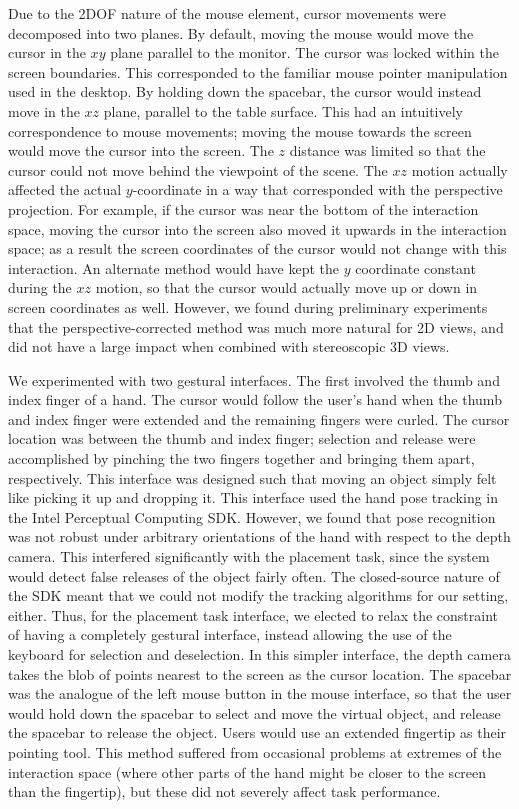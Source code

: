 \documentclass[pageno]{jpaper}
\begin{document}
Due to the 2DOF nature of the mouse element, cursor movements were decomposed into two planes.
By default, moving the mouse would move the cursor in the $xy$ plane parallel to the monitor.
The cursor was locked within the screen boundaries. This corresponded to the familiar mouse pointer
manipulation used in the desktop. By holding down the spacebar, the cursor would instead move in the
$xz$ plane, parallel to the table surface. This had an intuitively correspondence to mouse movements; moving
the mouse towards the screen would move the cursor into the screen. The $z$ distance was limited so that the
cursor could not move behind the viewpoint of the scene. The $xz$ motion actually affected the actual $y$-coordinate
in a way that corresponded with the perspective projection. For example, if the cursor was near the bottom of the interaction
space, moving the cursor into the screen also moved it upwards in the interaction space; as a result the screen
coordinates of the cursor would not change with this interaction. An alternate method would have kept the $y$ coordinate
constant during the $xz$ motion, so that the cursor would actually move up or down in screen coordinates as well. However,
we found during preliminary experiments that the perspective-corrected method was much more natural for 2D views, and did
not have a large impact when combined with stereoscopic 3D views.

We experimented with two gestural interfaces. The first involved the thumb and index finger of a hand. The cursor would
follow the user's hand when the thumb and index finger were extended and the remaining fingers were curled. The cursor
location was between the thumb and index finger; selection and release were accomplished by pinching the two fingers
together and bringing them apart, respectively. This interface was designed such that moving an object simply felt like
picking it up and dropping it. This interface used the hand pose tracking in the Intel Perceptual Computing SDK.
However, we found that pose recognition
was not robust under arbitrary orientations of the hand with respect to the depth camera. This interfered significantly with
the placement task, since the system would detect false releases of the object fairly often. The closed-source nature of the SDK meant that
we could not modify the tracking algorithms for our setting, either. Thus, for the placement task interface, we elected to
relax the constraint of having a completely gestural interface, instead allowing the use of the keyboard for selection and
deselection. In this simpler interface, the depth camera takes the blob of points nearest to the screen as the cursor location.
The spacebar was the analogue of the left mouse button in the mouse interface, so that the user would hold down the spacebar
to select and move the virtual object, and release the spacebar to release the object. Users would use an extended fingertip as
their pointing tool. This method suffered from occasional problems at extremes of the interaction space (where other parts of the hand
might be closer to the screen than the fingertip), but these did not severely affect task performance.
\end{document}
